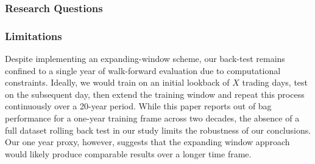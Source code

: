 \subsubsection{Research Questions}

\subsubsection{Limitations}


Despite implementing an expanding-window scheme, our back-test remains confined to a single year of walk-forward evaluation due to computational constraints. Ideally, we would train on an initial lookback of $X$ trading days, test on the subsequent day, then extend the training window and repeat this process continuously over a 20-year period. While this paper reports out of bag performance for a one-year training frame across two decades, the absence of a full dataset rolling back test in our study limits the robustness of our conclusions. Our one year proxy, however, suggests that the expanding window approach would likely produce comparable results over a longer time frame.


